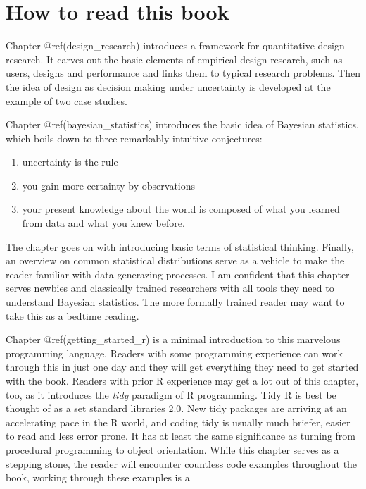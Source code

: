 \documentclass[]{svmono}
\providecommand{\tightlist}{%
  \setlength{\itemsep}{0pt}\setlength{\parskip}{0pt}}
\theoremstyle{definition}
\theoremstyle{definition}
\theoremstyle{definition}
\theoremstyle{remark}
\begin{document}
\section{How to read this book}\label{how-to-read-this-book}

Chapter @ref(design\_research) introduces a framework for quantitative
design research. It carves out the basic elements of empirical design
research, such as users, designs and performance and links them to
typical research problems. Then the idea of design as decision making
under uncertainty is developed at the example of two case studies.

Chapter @ref(bayesian\_statistics) introduces the basic idea of Bayesian
statistics, which boils down to three remarkably intuitive conjectures:

\begin{enumerate}
\def\labelenumi{\arabic{enumi}.}
\tightlist
\item
  uncertainty is the rule
\item
  you gain more certainty by observations
\item
  your present knowledge about the world is composed of what you learned
  from data and what you knew before.
\end{enumerate}

The chapter goes on with introducing basic terms of statistical
thinking. Finally, an overview on common statistical distributions serve
as a vehicle to make the reader familiar with data generazing processes.
I am confident that this chapter serves newbies and classically trained
researchers with all tools they need to understand Bayesian statistics.
The more formally trained reader may want to take this as a bedtime
reading.

Chapter @ref(getting\_started\_r) is a minimal introduction to this
marvelous programming language. Readers with some programming experience
can work through this in just one day and they will get everything they
need to get started with the book. Readers with prior R experience may
get a lot out of this chapter, too, as it introduces the \emph{tidy}
paradigm of R programming. Tidy R is best be thought of as a set
standard libraries 2.0. New tidy packages are arriving at an
accelerating pace in the R world, and coding tidy is usually much
briefer, easier to read and less error prone. It has at least the same
significance as turning from procedural programming to object
orientation. While this chapter serves as a stepping stone, the reader
will encounter countless code examples throughout the book, working
through these examples is a
\end{document}
